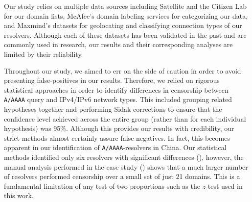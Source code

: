 Our study relies on multiple data sources including Satellite and the Citizen
Lab for our domain lists, McAfee's domain labeling services for categorizing
our data, and Maxmind's datasets for geolocating and classifying connection
types of our resolvers. Although each of these datasets has been validated in
the past and are commonly used in research, our results and their corresponding
analyses are limited by their reliability.
% 

Throughout our study, we aimed to err on the side of caution in order to avoid
presenting false-positives in our results. Therefore, we relied on rigorous
statistical approaches in order to identify differences in censorship between
{\tt A/AAAA} query and {IPv4/IPv6} network types. This included grouping
related hypotheses together and performing Sidak corrections to ensure that the
confidence level achieved across the entire group (rather than for each
individual hypothesis) was 95\%. Although this provides our results with
credibility, our strict methods almost certainly assure false-negatives. In
fact, this becomes apparent in our identification of {\tt A/AAAA}-resolvers in
China. Our statistical methods identified only six resolvers with significant
differences (), however, the manual analysis performed in
the case study () shows that a much larger number of resolvers
performed censorship over a small set of just 21 domains. This is a fundamental
limitation of any test of two proportions such as the $z$-test used in this
work. 


